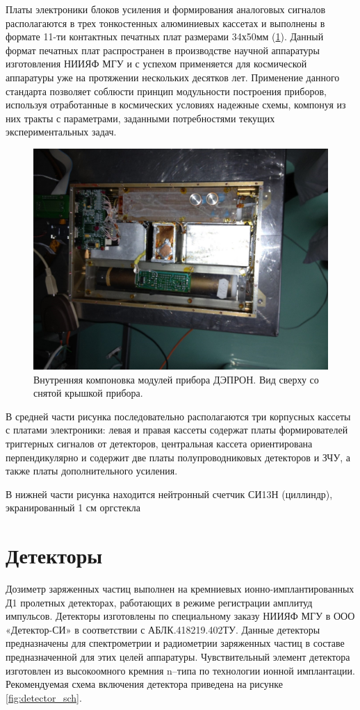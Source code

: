 Платы электроники блоков усиления и формирования аналоговых сигналов располагаются в трех тонкостенных алюминиевых кассетах и выполнены в формате 11-ти контактных печатных плат размерами 34х50мм (\ref{fig:Depron_inside}). Данный формат печатных плат распространен в производстве научной аппаратуры изготовления НИИЯФ МГУ и с успехом применяется для космической аппаратуры уже на протяжении нескольких десятков лет. Применение данного стандарта позволяет соблюсти принцип модульности построения приборов, используя отработанные в космических условиях надежные схемы, компонуя из них тракты с параметрами, заданными потребностями текущих экспериментальных задач. 

\begin{figure}
\centering
\includegraphics[width=0.7\linewidth]{images/Depron_inside}
\caption{Внутренняя компоновка модулей прибора ДЭПРОН. Вид сверху со снятой крышкой прибора.}
\label{fig:Depron_inside}
\end{figure}


В средней части рисунка последовательно располагаются три корпусных кассеты с платами электроники: левая и правая кассеты содержат платы формирователей триггерных сигналов от детекторов, центральная кассета ориентирована перпендикулярно и содержит две платы полупроводниковых детекторов и ЗЧУ, а также платы дополнительного усиления.

В нижней части рисунка находится нейтронный счетчик СИ13Н (циллиндр), экранированный 1 см оргстекла

\section{Детекторы}

Дозиметр заряженных частиц выполнен на кремниевых ионно-имплантированных Д1 пролетных детекторах, работающих в режиме регистрации амплитуд импульсов. Детекторы изготовлены по специальному заказу НИИЯФ МГУ в ООО «Детектор-СИ» в соответствии с АБЛК.418219.402ТУ. Данные детекторы предназначены для спектрометрии и радиометрии заряженных частиц в составе предназначенной для этих целей аппаратуры. Чувствительный элемент детектора изготовлен из высокоомного кремния n--типа по технологии ионной имплантации. Рекомендуемая схема включения детектора приведена на рисунке \ref{fig:detector_sch}. 



